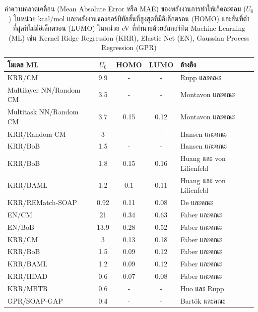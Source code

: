 \begin{table}[H]
    \begin{threeparttable}[b]
    \centering
    \caption{ค่าความคลาดเคลื่อน (Mean Absolute Error หรือ MAE) ของพลังงานการทำให้เกิดอะตอม ($U_{0}$) ในหน่วย kcal/mol 
    และพลังงานของออร์บิทัลชั้นที่สูงสุดที่มีอิเล็กตรอน (HOMO) และชั้นที่ต่ำที่สุดที่ไม่มีอิเล็กตรอน (LUMO) ในหน่วย eV ที่ทำนายด้วยอัลกอริทึม 
    Machine Learning (ML) เช่น Kernel Ridge Regression (KRR), Elastic Net (EN), Gaussian Process Regression 
    (GPR)}
    \label{tab:pred_ener_atom_orb_ml}
    \begin{tabular}{lcccl}
    \toprule
    \textbf{โมเดล ML} &\textbf{$U_{0}$} &HOMO &LUMO &\textbf{อ้างอิง} \\
    \midrule
    KRR/CM\tnote{1} &9.9 &- &- &Rupp และคณะ\autocite{rupp2012} \\
    Multilayer NN/Random CM\tnote{1} &3.5 &- &- &Montavon และคณะ\autocite{montavon2012} \\
    Multitask NN/Random CM\tnote{2} &3.7 &0.15 &0.12 &Montavon และคณะ\autocite{montavon2013} \\
    KRR/Random CM\tnote{1} &3 &- &- &Hansen และคณะ\autocite{hansen2013} \\
    KRR/BoB\tnote{1} &1.5 &- &- &Hansen และคณะ\autocite{hansen2015} \\
    KRR/BoB\tnote{2} &1.8 &0.15 &0.16 &Huang และ von Lilienfeld\autocite{huang2016} \\
    KRR/BAML\tnote{2} &1.2 &0.1 &0.11 &Huang และ von Lilienfeld\autocite{huang2016} \\
    KRR/REMatch-SOAP\tnote{2} &0.92 &0.11 &0.08 &De และคณะ\autocite{de2016} \\
    EN/CM\tnote{3} &21 &0.34 &0.63 &Faber และคณะ\autocite{faber2017} \\
    EN/BoB\tnote{3} &13.9 &0.28 &0.52 &Faber และคณะ\autocite{faber2017} \\
    KRR/CM\tnote{3} &3 &0.13 &0.18 &Faber และคณะ\autocite{faber2017} \\
    KRR/BoB\tnote{3} &1.5 &0.09 &0.12 &Faber และคณะ\autocite{faber2017} \\
    KRR/BAML\tnote{3} &1.2 &0.09 &0.12 &Faber และคณะ\autocite{faber2017} \\
    KRR/HDAD\tnote{3} &0.6 &0.07 &0.08 &Faber และคณะ\autocite{faber2017} \\
    KRR/MBTR\tnote{2} &0.6 &- &- &Huo และ Rupp\autocite{huo2022} \\
    GPR/SOAP-GAP\tnote{2} &0.4 &- &- &Bart\'{o}k และคณะ\autocite{bartok2017} \\

\end{tabular}
\end{threeparttable}
\end{table}
